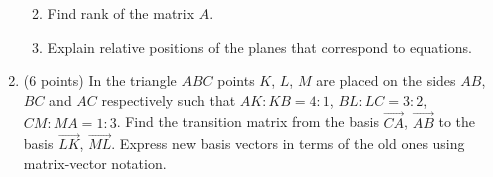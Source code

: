 \documentclass[]{exam}
\begin{document}
\begin{enumerate}
\begin{enumerate}
\begin{enumerate}
\end{enumerate}
\item Find rank of the matrix $A$.

\item Explain relative positions of the planes that correspond to equations.
\end{enumerate} 






\item (6 points)  
In the triangle $ABC$ points $K$, $L$, $M$ are placed on the sides $AB$, $BC$ and $AC$ respectively such that $AK : KB = 4 : 1$, $BL : LC = 3 : 2$, $CM : MA = 1 : 3$. Find the transition matrix from the basis $\overrightarrow{CA}$, $\overrightarrow{AB}$ to the basis $\overrightarrow{LK}$, $\overrightarrow{ML}$. Express new basis vectors in terms of the old ones using matrix-vector notation.






\end{enumerate}
\end{document}
